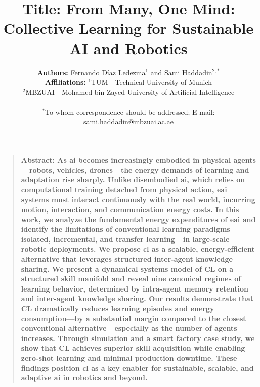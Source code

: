 \documentclass[12pt]{article}
\title{\textbf{Title:} From Many, One Mind: Collective Learning for Sustainable AI and Robotics}
\author
{\textbf{Authors:} Fernando D\'iaz Ledezma$ {}^{1}$ and Sami Haddadin${}^{2,\ast}$
	\\
	\normalsize{\textbf{Affiliations:} \normalsize{${}^{1}$TUM - Technical University of Munich}}\\
	\normalsize{${}^{2}$MBZUAI - Mohamed bin Zayed University of Artificial Intelligence}\\
	\\
	\normalsize{$^\ast$To whom correspondence should be addressed; E-mail: \url{sami.haddadin@mbzuai.ac.ae}}
}
\date{}
\newenvironment{sciabstract}{%
\begin{quote} \bf}
{\end{quote}}
\begin{document}
 

\baselineskip24pt


\maketitle 



\begin{sciabstract}
	\textbf{Abstract:}
As \ac{ai} becomes increasingly embodied in physical agents---robots, vehicles, drones---the energy demands of learning and adaptation rise sharply. Unlike disembodied \ac{ai}, which relies on computational training detached from physical action, \ac{eai} systems must interact continuously with the real world, incurring motion, interaction, and communication energy costs. In this work, we analyze the fundamental energy expenditures of \ac{eai} and identify the limitations of conventional learning paradigms---isolated, incremental, and transfer learning---in large-scale robotic deployments. We propose \ac{cl} as a scalable, energy-efficient alternative that leverages structured inter-agent knowledge sharing. We present a dynamical systems model of CL on a structured skill manifold and reveal nine canonical regimes of learning behavior, determined by intra-agent memory retention and inter-agent knowledge sharing. Our results demonstrate that CL dramatically reduces learning episodes and energy consumption---by a substantial margin compared to the closest conventional alternative---especially as the number of agents increases. Through simulation and a smart factory case study, we show that CL achieves superior skill acquisition while enabling zero-shot learning and minimal production downtime. These findings position \ac{cl} as a key enabler for sustainable, scalable, and adaptive \ac{ai} in robotics and beyond.    
\end{sciabstract}
\end{document}
